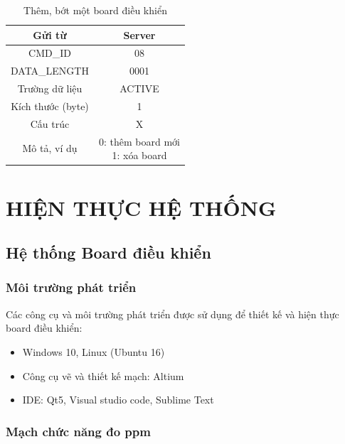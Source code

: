 \documentclass[a4paper,12pt,oneside]{article}
\begin{document}
\begin{table}[!htp]
\centering
\begin{tabular}{|c|c|}
\hline 
Gửi từ & Server \\ 
\hline 
CMD\_ID & 08 \\ 
\hline 
DATA\_LENGTH & 0001 \\ 
\hline 
Trường dữ liệu & ACTIVE \\ 
\hline 
Kích thước (byte) & 1 \\ 
\hline 
Cấu trúc & X \\ 
\hline 
Mô tả, ví dụ & \makecell{0: thêm board mới \\ 1: xóa board} \\ 
\hline 
\end{tabular} 
\caption{Thêm, bớt một board điều khiển}
\end{table}

\newpage
\section{HIỆN THỰC HỆ THỐNG}

\subsection{Hệ thống Board điều khiển}

\subsubsection{Môi trường phát triển}
Các công cụ và môi trường phát triển được sử dụng để thiết kế và hiện thực board điều khiển:
\begin{itemize}
\item Windows 10, Linux (Ubuntu 16)
\item Công cụ vẽ và thiết kế mạch: Altium
\item IDE: Qt5, Visual studio code, Sublime Text
\end{itemize}

\subsubsection{Mạch chức năng đo ppm}
\end{document}
